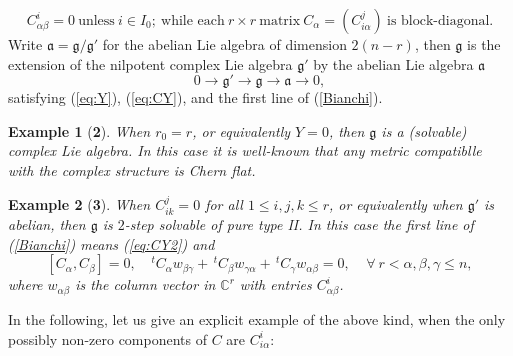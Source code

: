 \documentclass{amsart}
\newtheorem*{example}{Example}
\begin{document}
\begin{equation}  \label{eq:CY2}
 C^i_{\alpha \beta}=0 \ \mbox{unless}\ i\in I_0; \ \mbox{while each} \ r\times r \ \mbox{matrix} \ C_{\alpha} =(C^j_{i\alpha})\ \mbox{is block-diagonal.} 
 \end{equation}
Write ${\mathfrak a}={\mathfrak g}/{\mathfrak g}'$ for the abelian Lie algebra of dimension $2(n-r)$, then ${\mathfrak g}$ is the extension of the nilpotent complex Lie algebra ${\mathfrak g}'$ by the abelian Lie algebra ${\mathfrak a}$
$$ 0 \rightarrow {\mathfrak g}' \rightarrow {\mathfrak g} \rightarrow {\mathfrak a}  \rightarrow  0, $$
satisfying (\ref{eq:Y}), (\ref{eq:CY}), and the first line of (\ref{Bianchi}).  

\begin{example}[{\bf 2}]
When $r_0=r$, or equivalently $Y=0$, then ${\mathfrak g}$ is a (solvable) complex Lie algebra. In this case it is well-known that any metric compatiblle with the complex structure is Chern flat.
\end{example}

\begin{example}[{\bf 3}]
When $C^j_{ik}=0$ for all $1\leq i,j,k\leq r$, or equivalently when ${\mathfrak g}'$ is abelian, then ${\mathfrak g}$ is $2$-step solvable of pure type II. In this case the first line of (\ref{Bianchi}) means (\ref{eq:CY2}) and 
$$[C_{\alpha}, C_{\beta}]=0, \ \ \ \ \,^t\!C_{\alpha} w_{\beta\gamma} + \,^t\!C_{\beta} w_{\gamma\alpha}+\,^t\!C_{\gamma} w_{\alpha\beta} =0, \ \ \ \ \ \forall \ r<\alpha, \beta , \gamma \leq n, $$ 
where $w_{\alpha\beta}$ is the column vector in ${\mathbb C}^r$ with entries $C^i_{\alpha\beta}$. 
\end{example}

In the following, let us give an explicit example of the above kind, when the only possibly non-zero components of $C$ are $C^i_{i\alpha}$:
\end{document}
